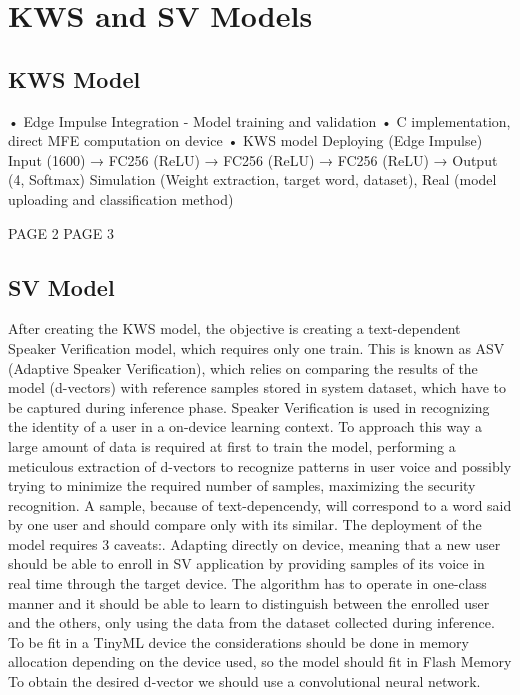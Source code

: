 \chapter{KWS and SV Models}
\label{cha:training} 
\section{KWS Model}
\label{sec:kws deployment}
• Edge Impulse Integration - Model training and validation\newline
• C implementation, direct MFE computation on device\newline
• KWS model Deploying (Edge Impulse)\newline
Input (1600) → FC256 (ReLU) → FC256 (ReLU) → FC256 (ReLU) → Output (4, Softmax)\newline
Simulation (Weight extraction, target word, dataset), Real (model uploading and classification method)\newline

\newpage
PAGE 2
\newpage
PAGE 3
\newpage
\section{SV Model}
\label{sec:sv creation}
After creating the KWS model, the objective is creating a text-dependent Speaker Verification model, which requires only one train. This is known as ASV (Adaptive Speaker Verification), which relies on comparing the results of the model (d-vectors) with reference samples stored in system dataset, which have to be captured during inference phase. Speaker Verification is used in recognizing the identity of a user in a on-device learning context. To approach this way a large amount of data is required at first to train the model, performing a meticulous extraction of d-vectors to recognize patterns in user voice and possibly trying to minimize the required number of samples, maximizing the security recognition. A sample, because of text-depencendy, will correspond to a word said by one user and should compare only with its similar.\newline
The deployment of the model requires 3 caveats:. Adapting directly on device, meaning that a new user should be able to enroll in SV application by providing samples of its voice in real time through the target device. The algorithm has to operate in one-class manner and it should be able to learn to distinguish between the enrolled user and the others, only using the data from the dataset collected during inference. To be fit in a TinyML device the considerations should be done in memory allocation depending on the device used, so the model should fit in Flash Memory\newline
To obtain the desired d-vector we should use a convolutional neural network.

